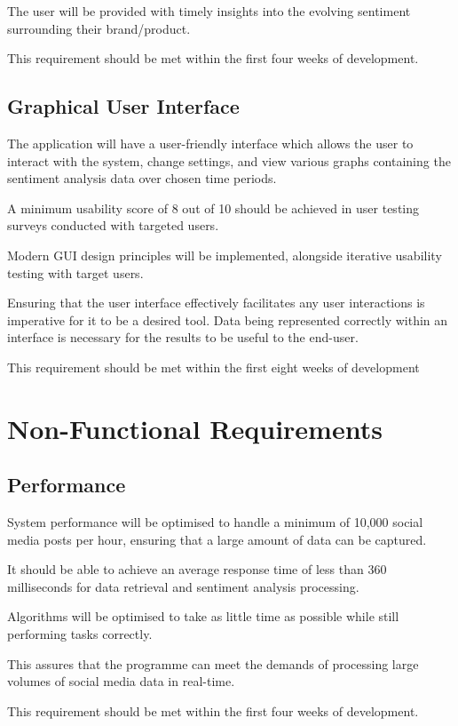     The user will be provided with timely insights into the evolving sentiment surrounding their brand/product.

    This requirement should be met within the first four weeks of development.

    \subsection{Graphical User Interface}
    The application will have a user-friendly interface which allows the user to interact with the system, change settings, and view various graphs containing the sentiment analysis data over chosen time periods.

    A minimum usability score of 8 out of 10 should be achieved in user testing surveys conducted with targeted users.

    Modern GUI design principles will be implemented, alongside iterative usability testing with target users.

    Ensuring that the user interface effectively facilitates any user interactions is imperative for it to be a desired tool. Data being represented correctly within an interface is necessary for the results to be useful to the end-user.

    This requirement should be met within the first eight weeks of development

\section{Non-Functional Requirements}

    \subsection{Performance}
    System performance will be optimised to handle a minimum of 10,000 social media posts per hour, ensuring that a large amount of data can be captured.

    It should be able to achieve an average response time of less than 360 milliseconds for data retrieval and sentiment analysis processing.

    Algorithms will be optimised to take as little time as possible while still performing tasks correctly.

    This assures that the programme can meet the demands of processing large volumes of social media data in real-time.

    This requirement should be met within the first four weeks of development.

